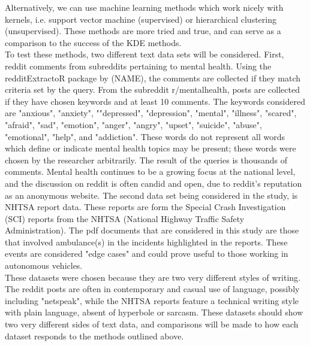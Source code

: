 Alternatively, we can use machine learning methods which work nicely with kernels, i.e. support vector machine (supervised) or hierarchical clustering (unsupervised). These methods are more tried and true, and can serve as a comparison to the success of the KDE methods.\\

To test these methods, two different text data sets will be considered. First, reddit comments from subreddits pertaining to mental health. Using the {redditExtractoR} package by (NAME), the comments are collected if they match criteria set by the query. From the subreddit r/mentalhealth, posts are collected if they have chosen keywords and at least 10 comments. The keywords considered are "anxious", "anxiety", ""depressed", "depression", "mental", "illness", "scared", "afraid", "sad", "emotion", "anger", "angry", "upset", "suicide", "abuse", "emotional", "help", and "addiction". These words do not represent all words which define or indicate mental health topics may be present; these words were chosen by the researcher arbitrarily. The result of the queries is thousands of comments. Mental health continues to be a growing focus at the national level, and the discussion on reddit is often candid and open, due to reddit's reputation as an anonymous website. The second data set being considered in the study, is NHTSA report data. These reports are form the Special Crash Investigation (SCI) reports from the NHTSA (National Highway Traffic Safety Administration). The pdf documents that are considered in this study are those that involved ambulance(s) in the incidents highlighted in the reports. These events are considered "edge cases" and could prove useful to those working in autonomous vehicles. \\

These datasets were chosen because they are two very different styles of writing. The reddit posts are often in contemporary and casual use of language, possibly including "netspeak", while the NHTSA reports feature a technical writing style with plain language, absent of hyperbole or sarcasm. These datasets should show two very different sides of text data, and comparisons will be made to how each dataset responds to the methods outlined above. \\